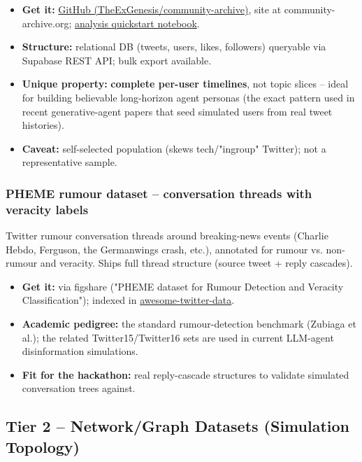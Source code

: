 \documentclass[twocolumn,10pt,letterpaper]{article}
\begin{document}
\begin{itemize}
\setlength{\itemsep}{0pt}
\setlength{\parskip}{0pt}
  \item \textbf{Get it:} \href{https://github.com/TheExGenesis/community-archive}{GitHub (TheExGenesis/community-archive)}, site at community-archive.org; \href{https://github.com/DefenderOfBasic/twitter-archive-toolkit/blob/main/Community\_Archive\_Analysis\_Quickstart.ipynb}{analysis quickstart notebook}.
  \item \textbf{Structure:} relational DB (tweets, users, likes, followers) queryable via Supabase REST API; bulk export available.
  \item \textbf{Unique property:} \textbf{complete per-user timelines}, not topic slices -- ideal for building believable long-horizon agent personas (the exact pattern used in recent generative-agent papers that seed simulated users from real tweet histories).
  \item \textbf{Caveat:} self-selected population (skews tech/"ingroup" Twitter); not a representative sample.
\end{itemize}

\subsubsection{PHEME rumour dataset -- conversation threads with veracity labels}

Twitter rumour conversation threads around breaking-news events (Charlie Hebdo, Ferguson, the Germanwings crash, etc.), annotated for rumour vs. non-rumour and veracity. Ships full thread structure (source tweet + reply cascades).


\begin{itemize}
\setlength{\itemsep}{0pt}
\setlength{\parskip}{0pt}
  \item \textbf{Get it:} via figshare ("PHEME dataset for Rumour Detection and Veracity Classification"); indexed in \href{https://github.com/shaypal5/awesome-twitter-data}{awesome-twitter-data}.
  \item \textbf{Academic pedigree:} the standard rumour-detection benchmark (Zubiaga et al.); the related Twitter15/Twitter16 sets are used in current LLM-agent disinformation simulations.
  \item \textbf{Fit for the hackathon:} real reply-cascade structures to validate simulated conversation trees against.
\end{itemize}

\subsection{Tier 2 -- Network/Graph Datasets (Simulation Topology)}
\end{document}
